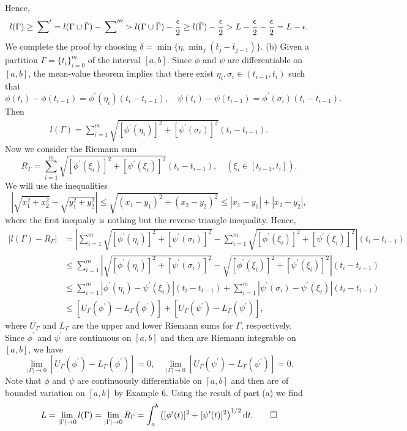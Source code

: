 \begin{exercise}{2.9}
\begin{equation*}
  \end{equation*}
  Hence,
  $$l(\Gamma)\geq\sideset{}{'}{\sum}=l(\Gamma\cup \bar{\Gamma})-\sideset{}{'''}{\sum}>l(\Gamma\cup \bar{\Gamma})-\frac{\epsilon}{2}\geq l(\bar{\Gamma})-\frac{\epsilon}{2}>L-\frac{\epsilon}{2}-\frac{\epsilon}{2}=L-\epsilon.$$
  We complete the proof by choosing $\delta=\min\{\eta,\min_j(\bar{t}_j-\bar{t}_{j-1})\}$.
  (b)
  Given a partition $\Gamma=\{t_i\}_{i=0}^m$
  of the interval $[a,b]$.
  Since $\phi$ and $\psi$ are differentiable on $[a,b]$, the mean-value theorem implies that there exist $\eta_i,\sigma_i\in (t_{i-1},t_i)$ such that
  $$\phi(t_i)-\phi(t_{i-1})=\phi^\prime(\eta_i)(t_i-t_{i-1}),\quad \psi(t_i)-\psi(t_{i-1})=\phi^\prime(\sigma_i)(t_i-t_{i-1}).$$
  Then
  \begin{equation*}
    \begin{aligned}
      l(\Gamma)=\sum_{i=1}^m\sqrt{[\phi^\prime(\eta_i)]^2+[\psi^\prime(\sigma_i)]^2}(t_i-t_{i-1}).
    \end{aligned}
  \end{equation*}
  Now we consider the Riemann sum
  $$R_\Gamma=\sum_{i=1}^m\sqrt{[\phi^\prime(\xi_i)]^2+[\psi^\prime(\xi_i)]^2}(t_i-t_{i-1}),\quad (\xi_i\in[t_{i-1},t_i]).$$
  We will use the inequalities
  \begin{equation*}
    \left|\sqrt{x_1^2+x_2^2}-\sqrt{y_1^2+y_2^2}\right|\leq \sqrt{(x_1-y_1)^2+(x_2-y_2)^2}\leq |x_1-y_1|+|x_2-y_2|,
  \end{equation*}
  where the first inequaliy is nothing but the reverse triangle inequality.
  Hence,
  \begin{equation*}
    \begin{aligned}
      |l(\Gamma)-R_\Gamma|&=\left|\sum_{i=1}^m\sqrt{[\phi^\prime(\eta_i)]^2+[\psi^\prime(\sigma_i)]^2}-\sum_{i=1}^m\sqrt{[\phi^\prime(\xi_i)]^2+[\psi^\prime(\xi_i)]^2}\right|(t_i-t_{i-1})\\&\leq\sum_{i=1}^m\left|\sqrt{[\phi^\prime(\eta_i)]^2+[\psi^\prime(\sigma_i)]^2}-\sqrt{[\phi^\prime(\xi_i)]^2+[\psi^\prime(\xi_i)]^2}\right|(t_i-t_{i-1})\\
      &\leq\sum_{i=1}^m|\phi^\prime(\eta_i)-\psi^\prime(\xi_i)|(t_i-t_{i-1})+\sum_{i=1}^m|\psi^\prime(\sigma_i)-\psi^\prime(\xi_i)|(t_i-t_{i-1})\\
      &\leq [U_\Gamma(\phi^\prime)-L_\Gamma(\phi^\prime)]+[U_\Gamma(\psi^\prime)-L_\Gamma(\psi^\prime)],
    \end{aligned}
  \end{equation*}
  where $U_\Gamma$ and $L_\Gamma$ are the upper and lower Riemann sums for $\Gamma$, respectively. Since $\phi^\prime$ and $\psi^\prime$ are continuous on $[a,b]$ and then are Riemann integrable on $[a,b]$, we have
  $$\lim_{|\Gamma|\to 0}[U_\Gamma(\phi^\prime)-L_\Gamma(\phi^\prime)]=0,\quad \lim_{|\Gamma|\to 0}[U_\Gamma(\psi^\prime)-L_\Gamma(\psi^\prime)]=0.$$
  Note that $\phi$ and $\psi$ are continuously differentiable on $[a,b]$ and then are of bounded variation on $[a,b]$ by Example 6. Using the result of part (a) we find
  \[L=\lim_{|\Gamma|\to0}l(\Gamma)=\lim_{|\Gamma|\to0}R_\Gamma=\int_a^b\left([\phi^\prime(t)]^2+[\psi^\prime(t)]^2\right)^{1/2}\mathrm{d}t. \qedhere \]
\end{exercise}

